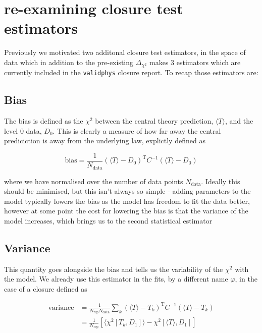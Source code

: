 \documentclass[a4paper]{article}
\newcommand{\dcs}{ \Delta_{\chi^{2}} }
\newcommand{\vphys}{ \texttt{validphys} }
\newcommand{\chis}{ \chi^{2} }
\newcommand{\thc}{\langle T \rangle}
\newcommand{\T}[1]{{#1}^{\mathrm{T}}}
\begin{document}
\section{re-examining closure test estimators}

Previously we motivated two additonal closure test estimators, in the space of data
which in addition to the pre-existing $\dcs$ makes 3 estimators which are currently
included in the \vphys closure report. To recap those estimators are:

\subsection*{Bias}

The bias is defined as the $\chis$ between the central theory prediction, $\thc$,
and the level 0 data, $D_{0}$. This is clearly a measure of how far away the
central prediciction is away from the underlying law, explictly defined as

\begin{equation}
    \mathrm{bias} = \frac{1}{N_{\mathrm{data}}} \T{(\thc - D_{0})} C^{-1} (\thc - D_{0})
\end{equation}

where we have normalised over the number of data points $N_{\mathrm{data}}$. Ideally this should
be minimised, but this isn't always so simple - adding parameters to the model
typically lowers the bias as the model has freedom to fit the data better, however at some point the
cost for lowering the bias is that the variance of the model increases, which brings us to the second
statistical estimator

\subsection*{Variance}

This quantity goes alongside the bias and tells us the variability of the $\chis$ with the model. We
already use this estimator in the fits, by a different name $\varphi$, in the case of a closure
defined as

\begin{equation}
    \begin{split}
        \mathrm{variance} &= \frac{1}{N_{\mathrm{rep}} N_{\mathrm{data}}} \sum_{k} \T{(\thc - T_{k})} C^{-1} (\thc - T_{k}) \\
        &= \frac{1}{N_{\mathrm{rep}}} \left[ \langle \chis \left[ T_{k}, D_{1} \right] \rangle - \chis[\thc, D_{1}] \right]
    \end{split}
\end{equation}
\end{document}
